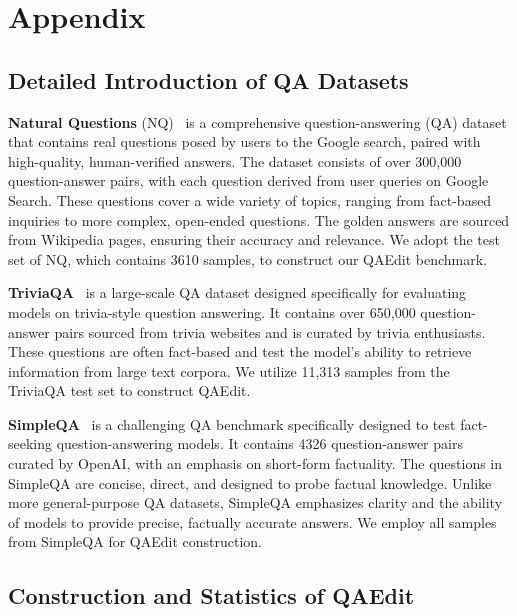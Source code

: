 \appendix

\section{Appendix}
\label{sec:appendix}


\subsection{Detailed Introduction of QA Datasets}
\label{apd:qa_data_intro}

\textbf{Natural Questions} (NQ)~\cite{kwiatkowski2019nq} is a comprehensive question-answering (QA) dataset that contains real questions posed by users to the Google search, paired with high-quality, human-verified answers. 
The dataset consists of over 300,000 question-answer pairs, with each question derived from user queries on Google Search. 
These questions cover a wide variety of topics, ranging from fact-based inquiries to more complex, open-ended questions. 
The golden answers are sourced from Wikipedia pages, ensuring their accuracy and relevance.
We adopt the test set of NQ, which contains 3610 samples, to construct our QAEdit benchmark.

\noindent \textbf{TriviaQA}~\cite{joshi-etal-2017-triviaqa} is a large-scale QA dataset designed specifically for evaluating models on trivia-style question answering. 
It contains over 650,000 question-answer pairs sourced from trivia websites and is curated by trivia enthusiasts. 
These questions are often fact-based and test the model's ability to retrieve information from large text corpora.
We utilize 11,313 samples from the TriviaQA test set to construct QAEdit.

\noindent \textbf{SimpleQA}~\cite{wei2024measuringshortformfactualitylarge} is a challenging QA benchmark specifically designed to test fact-seeking question-answering models. 
It contains 4326 question-answer pairs curated by OpenAI, with an emphasis on short-form factuality. 
The questions in SimpleQA are concise, direct, and designed to probe factual knowledge. 
Unlike more general-purpose QA datasets, SimpleQA emphasizes clarity and the ability of models to provide precise, factually accurate answers.
We employ all samples from SimpleQA for QAEdit construction.




\subsection{Construction and Statistics of QAEdit}
\label{apd:benchmark}

